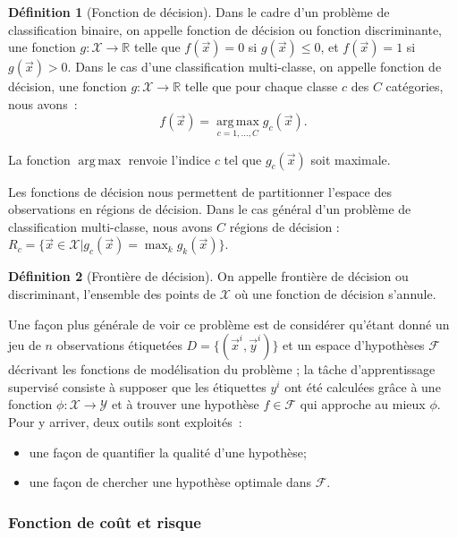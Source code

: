 \documentclass[a4paper,12pt,twoside]{report}
\theoremstyle{definition}
\newtheorem{defi}{Définition}
\theoremstyle{plain}
\theoremstyle{remark}
\begin{document}
\begin{defi}[Fonction de décision]
	Dans le cadre d'un problème de classification binaire, on appelle fonction de décision ou fonction discriminante, une fonction $g : \mathcal{X} \to \mathbb{R}$ telle que $f(\vec{x})=0$ si $g(\vec{x}) \leq 0$, et $f(\vec{x})=1$ si $g(\vec{x}) > 0$.
	Dans le cas d'une classification multi-classe, on appelle fonction de décision, une fonction $g : \mathcal{X} \to \mathbb{R}$ telle que pour chaque classe $c$ des $C$ catégories, nous avons~:
	\[ f(\vec{x}) = \operatorname*{arg\,max}_{c=1,\ldots,C} g_c(\vec{x}). \]
\end{defi}

La fonction $\operatorname{arg\,max}$ renvoie l'indice $c$ tel que $g_c(\vec{x})$ soit maximale.

Les fonctions de décision nous permettent de partitionner l'espace des observations en régions de décision. Dans le cas général d'un problème de classification multi-classe, nous avons $C$ régions de décision : $R_c = \{\vec{x} \in \mathcal{X} | g_c(\vec{x}) = \operatorname*{max}_{k} g_k(\vec{x})\}$.

\begin{defi}[Frontière de décision]
	On appelle frontière de décision ou discriminant, l'ensemble des points de $\mathcal{X}$ où une fonction de décision s'annule.
\end{defi}

Une façon plus générale de voir ce problème est de considérer qu'étant donné un jeu de $n$ observations étiquetées $D=\{(\vec{x}^i, \vec{y}^i)\}$ et un espace d'hypothèses $\mathcal{F}$ décrivant les fonctions de modélisation du problème ; la tâche d'apprentissage supervisé consiste à supposer que les étiquettes $y^i$ ont été calculées grâce à une fonction $\phi : \mathcal{X} \to \mathcal{Y}$ et à trouver une hypothèse $f \in \mathcal{F}$ qui approche au mieux $\phi$. Pour y arriver, deux outils sont exploités~:

\begin{itemize}
	\item une façon de quantifier la qualité d'une hypothèse;
	\item une façon de chercher une hypothèse optimale dans $\mathcal{F}$.
\end{itemize}

\subsubsection{Fonction de coût et risque}
\end{document}
